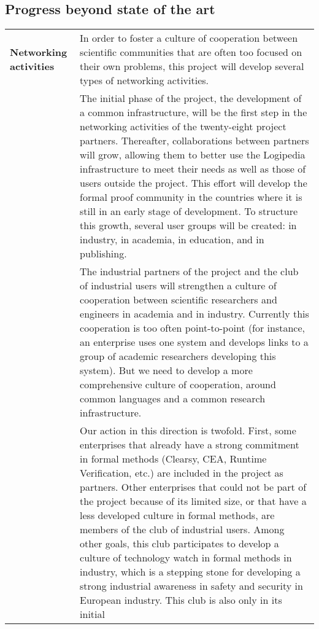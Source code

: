 \subsection*{Progress beyond state of the art}

\begin{longtable*}{|p{0.2\textwidth}|p{0.75\textwidth}|}
\hline
{\bf Networking activities}
&
In order to foster a culture of cooperation between scientific
communities that are often too focused on their own problems, this project
will develop several types of networking activities.\\
&
\hspace{0.4cm}
The initial phase of the project, the development of a common
infrastructure, will be the first step in the networking activities of
the twenty-eight project partners. Thereafter, collaborations between
partners will grow, allowing them to better use the Logipedia
infrastructure to meet their needs as well as those of users outside
the project. This effort will develop the formal proof community in
the countries where it is still in an early stage of development.  To
structure this growth, several user groups will be created: 
in industry, in academia, in education, and in publishing.\\
&
\hspace{0.4cm}
The industrial partners of the project
and the club of industrial users 
will strengthen a culture of cooperation between scientific
researchers and engineers in academia and in industry. Currently this
cooperation is too often point-to-point (for instance, an enterprise uses
one system and develops links to a group of academic researchers
developing this system). But we need to develop a more comprehensive
culture of cooperation, around common languages and a common research
infrastructure.\\
&
\hspace{0.4cm} Our action in this direction is twofold. First, some
enterprises that already have a strong commitment in formal methods
(Clearsy, CEA, Runtime Verification, etc.) are included in the project as
partners. Other enterprises that could not be part of the project
because of its limited size, or that have a less developed culture in
formal methods, are members of the club of industrial users. Among
other goals, this club participates to develop a culture of
technology watch in formal methods in industry, which is a stepping
stone for developing a strong industrial awareness in safety and
security in European industry. This club is also only in its initial

\end{longtable*}
